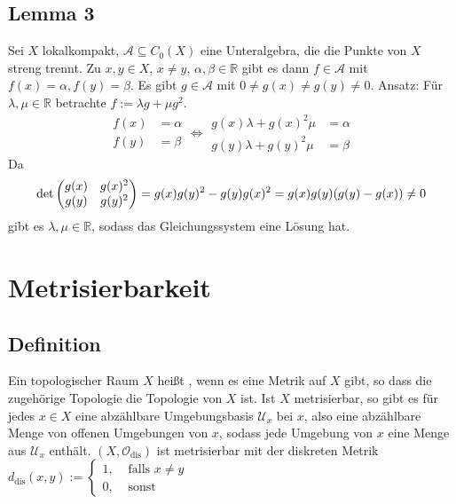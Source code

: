 \subsection[Lemma 3: Existenz von $f \in \mathcal{A}$ mit $f(x)=\alpha$, $f(y)=\beta$, wenn $\mathcal{A}$ streng trennt]{Lemma 3} %
\label{sub:69}
Sei $X$ lokalkompakt, $\mathcal{A} \subseteq C_0(X)$ eine Unteralgebra, die die Punkte von $X$ streng trennt. Zu $x,y \in X$, $x \not= y$, $\alpha, \beta \in \mathds{R}$
gibt es dann $f \in \mathcal{A}$ mit $f(x) = \alpha, f(y) = \beta$.
Es gibt $g \in \mathcal{A}$ mit $0 \not= g(x) \not= g(y) \not= 0$. Ansatz: Für $\lambda , \mu \in \mathds{R}$ betrachte $f := \lambda g + \mu g^2$.
\[
	\begin{aligned}
		f(x) &{}= \alpha \\
		f(y) &{}= \beta
	\end{aligned} 
	\iff
	\begin{aligned}
		g(x) \lambda + g(x)^2 \mu &= \alpha \\
		g(y) \lambda + g(y)^2 \mu &= \beta
	\end{aligned} 
\]
Da 
\[
	\det \begin{pmatrix}
		g(x)& g(x)^2 \\
		g(y) & g(y)^2
	\end{pmatrix} = g(x) g(y)^2 - g(y) g(x)^2 = g(x)g(y) \enbrace*{g(y) - g(x)} \not= 0 
\]
gibt es $\lambda , \mu \in \mathds{R}$, sodass das Gleichungssystem eine Lösung hat. \bewende
\newpage

\section{Metrisierbarkeit} %
\label{sec:7}

\subsection[Definition: Metrisierbar]{Definition} %
\label{sub:71}
Ein topologischer Raum $X$ heißt , wenn es eine Metrik auf $X$ gibt, so dass die zugehörige Topologie die Topologie von $X$ ist. 
Ist $X$ metrisierbar, so gibt es für jedes $x \in X$ eine abzählbare Umgebungsbasis $\mathcal{U}_x$ bei $x$, also eine abzählbare Menge von offenen Umgebungen von $x$,
sodass jede Umgebung von $x$ eine Menge aus $\mathcal{U}_x$ enthält. 
$(X, \mathcal{O}_{\text{dis}})$ ist metrisierbar mit der diskreten Metrik $d_{\text{dis}}(x,y) := \begin{cases}
	1, &\text{ falls }x \not= y\\
	0 , &\text{ sonst}
\end{cases}$

